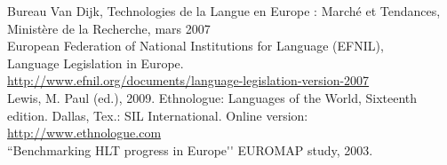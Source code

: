 
\cleardoublepage

\appendix
{}


Bureau Van Dijk, Technologies de la Langue en Europe : Marché et Tendances, Ministère de la Recherche, mars 2007\\


European Federation of National Institutions for Language (EFNIL),\\
Language Legislation in Europe.\\
\url{http://www.efnil.org/documents/language-legislation-version-2007}\\


Lewis, M. Paul (ed.), 2009. Ethnologue: Languages of the World, Sixteenth edition. Dallas, Tex.: SIL International. Online version: \url{http://www.ethnologue.com}\\


``Benchmarking HLT progress in Europe{\mbox '}{\mbox '} EUROMAP study, 2003.
\\

